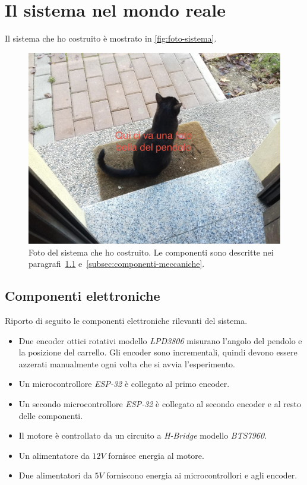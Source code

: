 \section{Il sistema nel mondo reale}
\label{sec:sistema-reale}
Il sistema che ho costruito è mostrato in \autoref{fig:foto-sistema}.

\begin{figure}[H]
    \centering
    \includegraphics[width=\textwidth]{assets/foto-pendolo}
    \caption[Foto del sistema]{Foto del sistema che ho costruito.
    Le componenti sono descritte nei
    paragrafi~\ref{subsec:componenti-elettroniche} e~\ref{subsec:componenti-meccaniche}.}
    \label{fig:foto-sistema}
\end{figure}

\subsection{Componenti elettroniche}
\label{subsec:componenti-elettroniche}
Riporto di seguito le componenti elettroniche rilevanti del sistema.
\begin{itemize}
    \item Due encoder ottici rotativi modello \emph{LPD3806} misurano l'angolo
    del pendolo e la posizione del carrello.
    Gli encoder sono incrementali, quindi devono essere azzerati manualmente
    ogni volta che si avvia l'esperimento.

    \item Un microcontrollore \emph{ESP-32} è collegato al primo encoder.

    \item Un secondo microcontrollore \emph{ESP-32} è collegato al
    secondo encoder e al resto delle componenti.

    \item Il motore è controllato da un circuito a \emph{H-Bridge}
    modello \emph{BTS7960}.

    \item Un alimentatore da $12V$ fornisce energia al motore.

    \item Due alimentatori da $5V$ forniscono energia ai microcontrollori
    e agli encoder.
\end{itemize}

